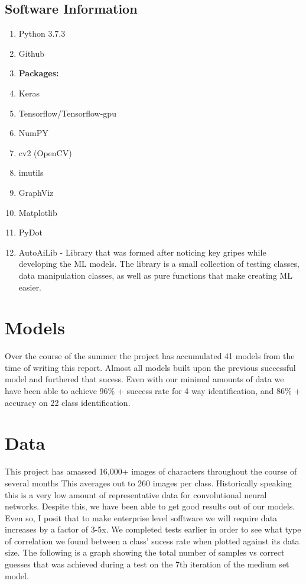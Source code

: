 \documentclass[12pt]{article} %
\begin{document}
\subsection{Software Information}
\begin{enumerate}[label = (\roman*)]
\item Python 3.7.3
\item Github
\item \textbf{Packages:}
\item Keras
\item Tensorflow/Tensorflow-gpu
\item NumPY
\item cv2 (OpenCV)
\item imutils
\item GraphViz
\item Matplotlib
\item PyDot
\item AutoAiLib - Library that was formed after noticing key gripes while developing the ML models. The library is a small collection of testing classes, data manipulation classes, as well as pure functions that make creating ML easier.
\end{enumerate}

\section{Models}
\noindent\makebox[\linewidth]{\rule{15cm}{0.4pt}}
Over the course of the summer the project has accumulated 41 models from the time of writing this report. Almost all models built upon the previous successful model and furthered that sucess. Even with our minimal amounts of data we have been able to achieve 96\% + success rate for 4 way identification, and 86\% + accuracy on 22 class identification.


\section{Data}
\noindent\makebox[\linewidth]{\rule{15cm}{0.4pt}}
This project has amassed 16,000+ images of characters throughout the course of several months This averages out to 260 images per class. Historically speaking this is a very low amount of representative data for convolutional neural networks. Despite this, we have been able to get good results out of our models. Even so, I posit that to make enterprise level sofftware we will require data increases by a factor of 3-5x. We completed tests earlier in order to see what type of correlation we found between a class' sucess rate when plotted against its data size.
The following is a graph showing the total number of samples vs correct guesses that was achieved during a test on the 7th iteration of the medium set model.
\end{document}
